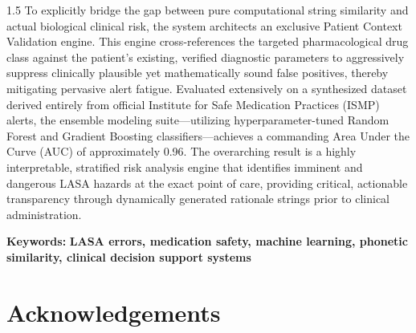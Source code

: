 \documentclass[12pt,a4paper]{report}
\begin{document}
\begin{spacing}{1.5}
To explicitly bridge the gap between pure computational string similarity and actual biological clinical risk, the system architects an exclusive Patient Context Validation engine. This engine cross-references the targeted pharmacological drug class against the patient's existing, verified diagnostic parameters to aggressively suppress clinically plausible yet mathematically sound false positives, thereby mitigating pervasive alert fatigue. Evaluated extensively on a synthesized dataset derived entirely from official Institute for Safe Medication Practices (ISMP) alerts, the ensemble modeling suite---utilizing hyperparameter-tuned Random Forest and Gradient Boosting classifiers---achieves a commanding Area Under the Curve (AUC) of approximately 0.96. The overarching result is a highly interpretable, stratified risk analysis engine that identifies imminent and dangerous LASA hazards at the exact point of care, providing critical, actionable transparency through dynamically generated rationale strings prior to clinical administration.

\vspace{0.5cm}
\textbf{Keywords:} \bfseries{LASA errors, medication safety, machine learning, phonetic similarity, clinical decision support systems}
\end{spacing}

\newpage
\section*{\huge \bfseries Acknowledgements}
\vspace{1cm}
\end{document}
